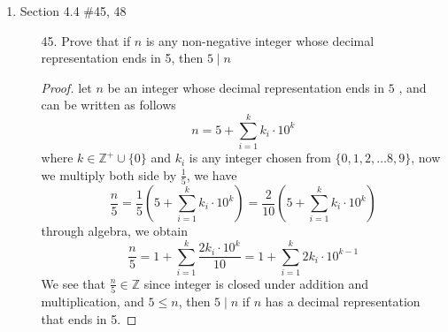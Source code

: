 \documentclass[12pt]{article}
\newcommand{\Z}{\mathbb{Z}}
\newcommand{\paren}[1]{\left( #1 \right)}
\newcommand{\zero}{\{0\}}
\newcommand{\then}{\rightarrow}
\begin{document}
\begin{enumerate}
\begin{enumerate}
            \item[29.] \( \forall a,b \in \Z \paren{ a \mid b \then a^2 \mid b^2}\)
            \begin{proof}[disproof]
                let $a=3 \in \Z$ and $b = 6 \in \Z$, then $a^2 = 9$ and $b^2 = 36$
                \[
                a \mid b,  \quad \text{but }a^2 \nmid b^2 
                \]
            \end{proof}

            \item[30.] \( \forall a,n \in \Z \paren{ a \mid n^2 \wedge a \leq n \then a \mid n}\)
            \begin{proof}[disproof]
                let $ a = 4 \in \Z$ and $ n = 6 \in \Z$, $n^2 = 36 \in \Z$, then
                \[
                a\leq n, \;a \mid  n^2 \quad \text{but } a \nmid n
                \]
                
            \end{proof}
        \item[37.] Factor the following integers into prime factors
            \begin{enumerate}[a.]
                \item $1176 = 2^3 \cdot 3 \cdot 7^2$
                \item $5733 = 3^2 \cdot 7^2 \cdot 13$
                \item $3675 = 3 \cdot 5^2 \cdot 7^2$
            \end{enumerate}
        \end{enumerate}

    \newpage
    
    \item Section 4.4 \#45, 48
        \begin{enumerate}
            \item[45.] Prove that if $n$ is any non-negative integer whose decimal representation ends in 5, then $5 \mid n$
                \begin{proof}
                    let $n$ be an integer whose decimal representation ends in $5$ , and can be written as follows
                    \[
                    n = 5 + \sum_{i=1}^{k} k_i \cdot 10^k
                    \]
                    where $k \in \Z^+ \cup \zero$ and $k_i$ is any integer chosen from $\{0,1,2, \ldots 8, 9\}$, now we multiply both side by $\frac{1}{5}$, we have
                    \[
                    \frac{n}{5} = \frac{1}{5} \paren{5+ \sum_{i=1}^{k} k_i \cdot 10^k} 
                    = \frac{2}{10} \paren{5 + \sum_{i=1}^{k} k_i \cdot 10^k}
                    \]
                    through algebra, we obtain
                    \[
                    \frac{n}{5} = 1 + \sum_{i=1}^{k} \frac{2k_i \cdot 10^k}{10} = 1+ \sum_{i=1}^{k} 2k_i \cdot 10^{k-1}
                    \]
                    We see that $ \frac{n}{5} \in \Z$ since integer is closed under addition and multiplication, and $ 5 \leq n$, then $5 \mid n$ if $n$ has a decimal representation that ends in 5.
                    

\end{proof}
\end{enumerate}
\end{enumerate}
\end{document}
